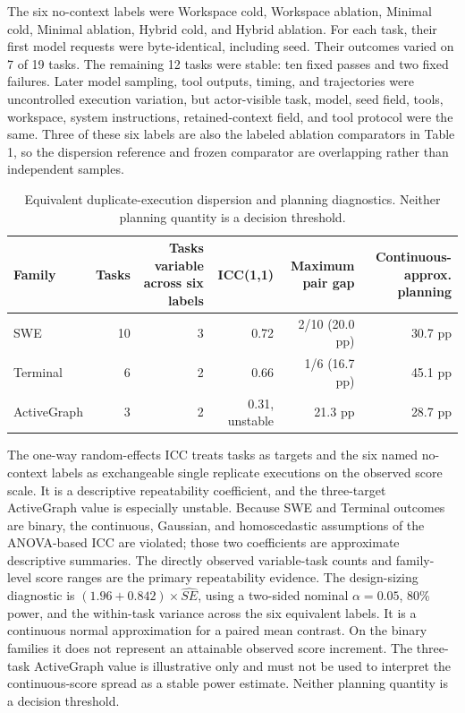 \documentclass[10pt,twocolumn]{article}
\begin{document}
The six no-context labels were Workspace cold, Workspace ablation,
Minimal cold, Minimal ablation, Hybrid cold, and Hybrid ablation. For
each task, their first model requests were byte-identical, including
seed. Their outcomes varied on 7 of 19 tasks. The remaining 12 tasks
were stable: ten fixed passes and two fixed failures. Later model
sampling, tool outputs, timing, and trajectories were uncontrolled
execution variation, but actor-visible task, model, seed field, tools,
workspace, system instructions, retained-context field, and tool
protocol were the same. Three of these six labels are also the labeled
ablation comparators in Table 1, so the dispersion reference and frozen
comparator are overlapping rather than independent samples.

\begin{table}[t]
\caption{Equivalent duplicate-execution dispersion and planning diagnostics. Neither planning quantity is a decision threshold.}
\label{tab:duplicates}
\centering\scriptsize
\begin{tabular}{@{}lrrrrr@{}}
\toprule
\textbf{Family} & \textbf{Tasks} & \textbf{Tasks variable across six labels} & \textbf{ICC(1,1)} & \textbf{Maximum pair gap} & \textbf{Continuous-approx. planning}\\
\midrule
SWE & 10 & 3 & 0.72 & 2/10 (20.0 pp) & 30.7 pp\\
Terminal & 6 & 2 & 0.66 & 1/6 (16.7 pp) & 45.1 pp\\
ActiveGraph & 3 & 2 & 0.31, unstable & 21.3 pp & 28.7 pp\\
\bottomrule
\end{tabular}
\end{table}

The one-way random-effects ICC treats tasks as targets and the six named
no-context labels as exchangeable single replicate executions on the
observed score scale. It is a descriptive repeatability coefficient, and
the three-target ActiveGraph value is especially unstable. Because SWE
and Terminal outcomes are binary, the continuous, Gaussian, and
homoscedastic assumptions of the ANOVA-based ICC are violated; those two
coefficients are approximate descriptive summaries. The directly
observed variable-task counts and family-level score ranges are the
primary repeatability evidence. The design-sizing diagnostic is
\((1.96 + 0.842) \times \widehat{SE}\), using a two-sided nominal
\(\alpha=0.05\), 80\% power, and the within-task variance across the six
equivalent labels. It is a continuous normal approximation for a paired
mean contrast. On the binary families it does not represent an
attainable observed score increment. The three-task ActiveGraph value is
illustrative only and must not be used to interpret the continuous-score
spread as a stable power estimate. Neither planning quantity is a
decision threshold.
\end{document}

